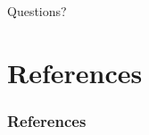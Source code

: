 \documentclass{beamer}
\begin{document}

\begin{frame}
    Questions?
\end{frame}



\section{References}

\begin{frame}[t, allowframebreaks]
    \frametitle{References}
    
    
\end{frame}
\end{document}
